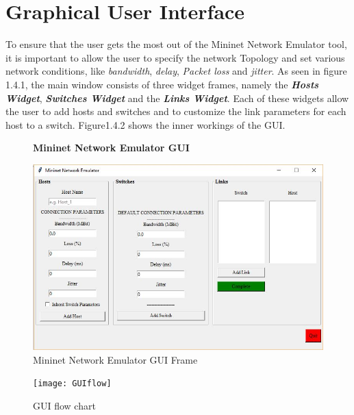 \section{Graphical User Interface}
To ensure that the user gets the most out of the Mininet Network Emulator tool, it is important 
to allow the user to specify the network Topology and set various network conditions, like \textit{bandwidth}, \textit{delay},
\textit{Packet loss} and \textit{jitter}. As seen in figure 1.4.1, the main window consists of three widget frames, namely the \textbf{\textit{Hosts Widget}},  \textbf{\textit{Switches Widget}} and the  \textbf{\textit{Links Widget}}. Each of these widgets allow the user to add hosts and switches and to customize the link parameters for each host to a switch. Figure1.4.2 shows the inner workings of the GUI.
\begin{figure}[H]
    \centering
    \textbf{Mininet Network Emulator GUI}\par\medskip
    \includegraphics[scale=0.5]{Entire_window}
    \caption{Mininet Network Emulator GUI Frame}
\end{figure}
\begin{figure}[H]
    \centering
    \texttt{[image: GUIflow]}
    \caption{GUI flow chart}
\end{figure}

